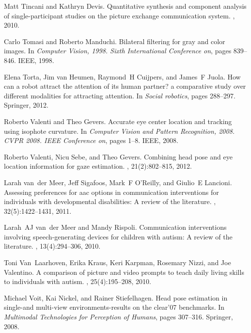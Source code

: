 \documentclass{ut-thesis}
\begin{document}
\begin{thebibliography}{100}
Matt Tincani and Kathryn Devis.
\newblock Quantitative synthesis and component analysis of single-participant
  studies on the picture exchange communication system.
, 2010.

Carlo Tomasi and Roberto Manduchi.
\newblock Bilateral filtering for gray and color images.
\newblock In {\em Computer Vision, 1998. Sixth International Conference on},
  pages 839--846. IEEE, 1998.

Elena Torta, Jim van Heumen, Raymond~H Cuijpers, and James~F Juola.
\newblock How can a robot attract the attention of its human partner? a
  comparative study over different modalities for attracting attention.
\newblock In {\em Social robotics}, pages 288--297. Springer, 2012.

Roberto Valenti and Theo Gevers.
\newblock Accurate eye center location and tracking using isophote curvature.
\newblock In {\em Computer Vision and Pattern Recognition, 2008. CVPR 2008.
  IEEE Conference on}, pages 1--8. IEEE, 2008.

Roberto Valenti, Nicu Sebe, and Theo Gevers.
\newblock Combining head pose and eye location information for gaze estimation.
, 21(2):802--815, 2012.

Larah van~der Meer, Jeff Sigafoos, Mark~F O’Reilly, and Giulio~E Lancioni.
\newblock Assessing preferences for aac options in communication interventions
  for individuals with developmental disabilities: A review of the literature.
, 32(5):1422--1431, 2011.

Larah~AJ van~der Meer and Mandy Rispoli.
\newblock Communication interventions involving speech-generating devices for
  children with autism: A review of the literature.
, 13(4):294--306, 2010.

Toni Van~Laarhoven, Erika Kraus, Keri Karpman, Rosemary Nizzi, and Joe
  Valentino.
\newblock A comparison of picture and video prompts to teach daily living
  skills to individuals with autism.
,
  25(4):195--208, 2010.

Michael Voit, Kai Nickel, and Rainer Stiefelhagen.
\newblock Head pose estimation in single-and multi-view environments-results on
  the clear’07 benchmarks.
\newblock In {\em Multimodal Technologies for Perception of Humans}, pages
  307--316. Springer, 2008.


\end{thebibliography}
\end{document}
